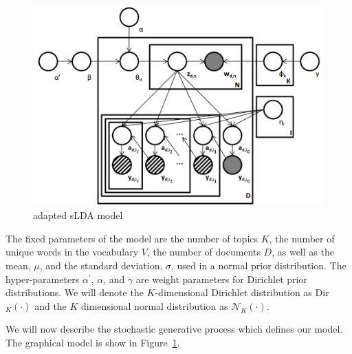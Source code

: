 \documentclass{article}
\begin{document}
%
\begin{figure}[h]
 \centering \includegraphics[scale=0.3]{Graphical_Model2} \caption{adapted sLDA model}


\label{fig:example} 
\end{figure}


The fixed parameters of the model are the number of topics $K$, the
number of unique words in the vocabulary $V$, the number of documents
$D$, as well as the mean, $\mu$, and the standard deviation, $\sigma$,
used in a normal prior distribution. The hyper-parameters $\alpha^{\prime}$,
$\alpha$, and $\gamma$ are weight parameters for Dirichlet prior
distributions. We will denote the $K$-dimensional Dirichlet distribution
as Dir$_{K}(\cdot)$ and the $K$ dimensional normal distribution
as $\mathcal{N}_{K}(\cdot)$.

We will now describe the stochastic generative process which defines
our model. The graphical model is show in Figure~\ref{fig:example}.
\end{document}
